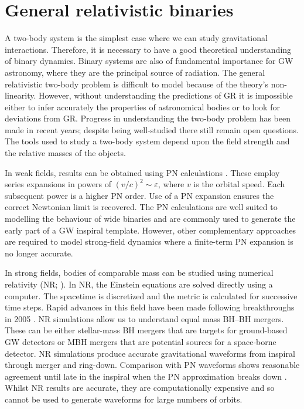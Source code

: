 \section{General relativistic binaries}\label{sec:two-body}

A two-body system is the simplest case where we can study gravitational interactions. Therefore, it is necessary to have a good theoretical understanding of binary dynamics. Binary systems are also of fundamental importance for GW astronomy, where they are the principal source of radiation. The general relativistic two-body problem is difficult to model because of the theory's non-linearity. However, without understanding the predictions of GR it is impossible either to infer accurately the properties of astronomical bodies or to look for deviations from GR. Progress in understanding the two-body problem has been made in recent years; despite being well-studied there still remain open questions. The tools used to study a two-body system depend upon the field strength and the relative masses of the objects.

In weak fields, results can be obtained using PN calculations \citep{Blanchet2006}. These employ series expansions in powers of  $(v/c)^2 \sim \varepsilon$, where $v$ is the orbital speed. Each subsequent power is a higher PN order. Use of a PN expansion ensures the correct Newtonian limit is recovered. The PN calculations are well suited to modelling the behaviour of wide binaries and are commonly used to generate the early part of a GW inspiral template. However, other complementary approaches are required to model strong-field dynamics where a finite-term PN expansion is no longer accurate.

In strong fields, bodies of comparable mass can be studied using numerical relativity (NR; \citealt{Centrella2010,Pfeiffer2012,Sperhake2013}). In NR, the Einstein equations are solved directly using a computer. The spacetime is discretized and the metric is calculated for successive time steps. Rapid advances in this field have been made following breakthroughs in 2005 \citep{Pretorius2005,Campanelli2006,Baker2006}. NR simulations allow us to understand equal mass BH--BH mergers. These can be either stellar-mass BH mergers that are targets for ground-based GW detectors or MBH mergers that are potential sources for a space-borne detector. NR simulations produce accurate gravitational waveforms from inspiral through merger and ring-down. Comparison with PN waveforms shows reasonable agreement until late in the inspiral when the PN approximation breaks down \citep[e.g.,][]{Baker2007,Buonanno2007}. Whilst NR results are accurate, they are computationally expensive and so cannot be used to generate waveforms for large numbers of orbits.

